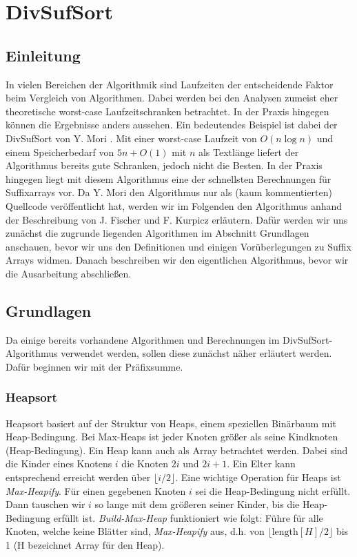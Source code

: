 \section{DivSufSort}
\label{algorithm:divsufsort}

\subsection{Einleitung}
In  vielen Bereichen der Algorithmik sind Laufzeiten der entscheidende Faktor beim Vergleich von Algorithmen. Dabei werden bei den Analysen zumeist eher theoretische worst-case Laufzeitschranken betrachtet.
In der Praxis hingegen können die Ergebnisse anders aussehen. Ein bedeutendes Beispiel ist dabei der \glqq DivSufSort\grqq{} von Y. Mori \cite{saca:5:repo}. Mit einer worst-case Laufzeit von $O(n\log{n})$ und einem Speicherbedarf von $5n + O(1)$ mit $n$ als Textlänge liefert der Algorithmus bereits gute Schranken, jedoch nicht die Besten. In der Praxis hingegen liegt mit diesem Algorithmus eine der schnellsten Berechnungen für Suffixarrays vor. Da Y. Mori den Algorithmus nur als (kaum kommentierten) Quellcode veröffentlicht hat, werden wir im Folgenden den Algorithmus anhand der Beschreibung von J. Fischer und F. Kurpicz \cite{saca:5} erläutern. Dafür werden wir uns zunächst die zugrunde liegenden Algorithmen im Abschnitt Grundlagen anschauen, bevor wir uns den Definitionen und einigen Vorüberlegungen zu Suffix Arrays widmen. Danach beschreiben wir den eigentlichen Algorithmus, bevor wir die Ausarbeitung abschließen.

\iffalse
\subsection{Grundlagen}
Da einige bereits vorhandene Algorithmen und Berechnungen im DivSufSort-Algorithmus verwendet werden, sollen diese zunächst näher erläutert werden. Dafür beginnen wir mit der Präfixsumme.


\subsubsection{Heapsort}
Heapsort basiert auf der Struktur von Heaps, einem speziellen Binärbaum mit Heap-Bedingung. Bei Max-Heaps ist jeder Knoten größer als seine Kindknoten (Heap-Bedingung). Ein Heap kann auch als Array betrachtet werden. Dabei sind die Kinder eines Knotens $i$ die Knoten $2i$ und $2i + 1$. Ein Elter kann entsprechend erreicht werden über $\lfloor i/2 \rfloor$. Eine wichtige Operation für Heaps ist \textit{Max-Heapify}. Für einen gegebenen Knoten $i$ sei die Heap-Bedingung nicht erfüllt. Dann tauschen wir $i$ so lange mit dem größeren seiner Kinder, bis die Heap-Bedingung erfüllt ist. \textit{Build-Max-Heap} funktioniert wie folgt: Führe für alle Knoten, welche keine Blätter sind, \textit{Max-Heapify} aus, d.h. von $\lfloor \text{length}[H]/2\rfloor$ bis 1 (H bezeichnet Array für den Heap).

